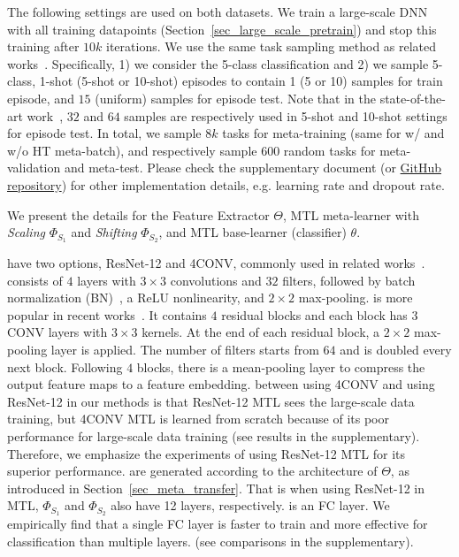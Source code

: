 The following settings are used on both datasets.
We train a large-scale DNN with all training datapoints (Section~\ref{sec_large_scale_pretrain}) and stop this training after $10k$ iterations.
%
We use the same task sampling method as related works~\cite{FinnAL17, RaviICLR2017}. Specifically, 1) we consider the 5-class classification and 2) we sample 5-class, 1-shot (5-shot or 10-shot) episodes to contain 1 (5 or 10) samples for train episode, and $15$ (uniform) samples for episode test.
Note that in the state-of-the-art work~\cite{OreshkinNIPS18}, $32$ and $64$ samples are respectively used in 5-shot and 10-shot settings for episode test.
%
In total, we sample $8k$ tasks for meta-training (same for w/ and w/o HT meta-batch), and respectively sample $600$ random tasks for meta-validation and meta-test. 
Please check the supplementary document (or \href{https://github.com/y2l/meta-transfer-learning-tensorflow}{GitHub repository}) for other implementation details, e.g. learning rate and dropout rate.


We present the details for
the Feature Extractor $\Theta$, 
MTL meta-learner with \emph{Scaling} $\Phi_{S_1}$ and \emph{Shifting} $\Phi_{S_2}$, 
and MTL base-learner (classifier) $\theta$. 

 have two options, ResNet-12 and 4CONV, commonly used in related works~\cite{FinnAL17, VinyalsBLKW16, RaviICLR2017, MunkhdalaiICML18, MishraICLR2018, OreshkinNIPS18}.
%
 consists of $4$ layers with $3\times 3$ convolutions and $32$ filters, followed by batch normalization (BN)~\cite{IoffeICML15}, a ReLU nonlinearity, and $2\times 2$ max-pooling.
%
 is more popular in recent works~\cite{OreshkinNIPS18, MishraICLR2018, FranceschiICML18, MunkhdalaiICML18}. It contains $4$ residual blocks and each block has $3$ CONV layers with $3\times 3$ kernels.
%
At the end of each residual block, a $2\times 2$ max-pooling layer is applied. The number of filters starts from $64$ and is doubled every next block. 
%
Following $4$ blocks, there is a mean-pooling layer to compress the output feature maps to a feature embedding.
 between using 4CONV and using ResNet-12 in our methods is that ResNet-12 MTL sees the large-scale data training, but 4CONV MTL is learned from scratch because of its poor performance for large-scale data training (see results in the supplementary).
%
Therefore, we emphasize the experiments of using ResNet-12 MTL for its superior performance.
%
 are generated according to the architecture of $\Theta$, as introduced in Section~\ref{sec_meta_transfer}. That is when using ResNet-12 in MTL, $\Phi_{S_1}$ and $\Phi_{S_2}$ also have 12 layers, respectively.
%
 is an FC layer. We empirically find that a single FC layer is faster to train and more effective for classification than multiple layers.
(see comparisons in the supplementary).

